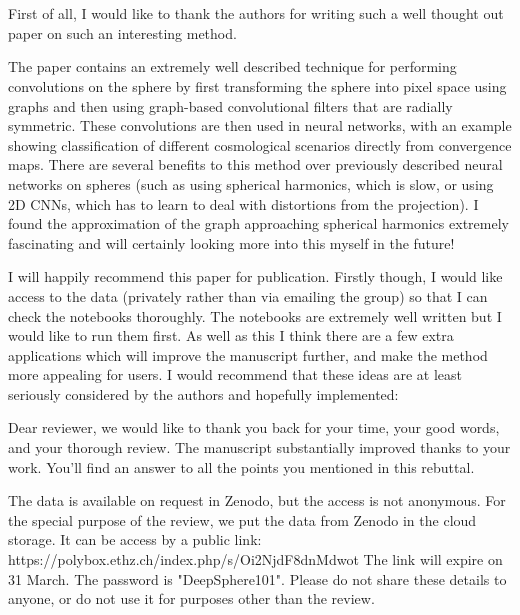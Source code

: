 \documentclass[12pt,a4paper]{article}
\newcommand{\1}{\b{1}}              %
\newcommand{\0}{\b{0}}              %
\begin{document}
\section{}
\label{sec:dataset}
\begin{mdframed}[style=comment]
First of all, I would like to thank the authors for writing such a well thought out paper on such an interesting method.

The paper contains an extremely well described technique for performing convolutions on the sphere by first transforming the sphere into pixel space using graphs and then using graph-based convolutional filters that are radially symmetric. These convolutions are then used in neural networks, with an example showing classification of different cosmological scenarios directly from convergence maps. There are several benefits to this method over previously described neural networks on spheres (such as using spherical harmonics, which is slow, or using 2D CNNs, which has to learn to deal with distortions from the projection). I found the approximation of the graph approaching spherical harmonics extremely fascinating and will certainly looking more into this myself in the future!

I will happily recommend this paper for publication. Firstly though, I would like access to the data (privately rather than via emailing the group) so that I can check the notebooks thoroughly. The notebooks are extremely well written but I would like to run them first. As well as this I think there are a few extra applications which will improve the manuscript further, and make the method more appealing for users. I would recommend that these ideas are at least seriously considered by the authors and hopefully implemented:
\end{mdframed}

Dear reviewer, we would like to thank you back for your time, your good words, and your thorough review.
The manuscript substantially improved thanks to your work.
You'll find an answer to all the points you mentioned in this rebuttal.

The data is available on request in Zenodo, but the access is not anonymous.
For the special purpose of the review, we put the data from Zenodo in the cloud storage.
It can be access by a public link:
https://polybox.ethz.ch/index.php/s/Oi2NjdF8dnMdwot
The link will expire on 31 March.
The password is "DeepSphere101".
Please do not share these details to anyone, or do not use it for purposes other than the review.
\end{document}
